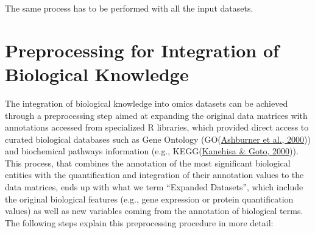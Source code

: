 \documentclass[a4paper, nobind]{templates/ociamthesis}
\begin{document}
The same process has to be performed with all the input datasets.

\clearpage

\hypertarget{preprocess}{%
\section{Preprocessing for Integration of Biological Knowledge}\label{preprocess}}

The integration of biological knowledge into omics datasets can be achieved through a preprocessing step aimed at expanding the original data matrices with annotations accessed from specialized R libraries, which provided direct access to curated biological databases such as Gene Ontology (GO(\protect\hyperlink{ref-ashburner_gene_2000}{Ashburner et al., 2000})) and biochemical pathways information (e.g., KEGG(\protect\hyperlink{ref-kanehisa_kegg_2000}{Kanehisa \& Goto, 2000})). This process, that combines the annotation of the most significant biological entities with the quantification and integration of their annotation values to the data matrices, ends up with what we term ``Expanded Datasets'', which include the original biological features (e.g., gene expression or protein quantification values) as well as new variables coming from the annotation of biological terms. The following steps explain this preprocessing procedure in more detail:
\end{document}
